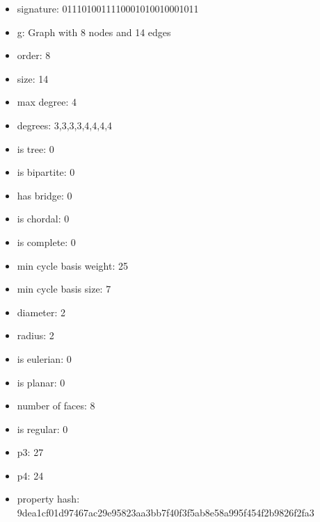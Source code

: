 \begin{itemize}
\item signature: 0111010011110001010010001011
\item g: Graph with 8 nodes and 14 edges
\item order: 8
\item size: 14
\item max degree: 4
\item degrees: 3,3,3,3,4,4,4,4
\item is tree: 0
\item is bipartite: 0
\item has bridge: 0
\item is chordal: 0
\item is complete: 0
\item min cycle basis weight: 25
\item min cycle basis size: 7
\item diameter: 2
\item radius: 2
\item is eulerian: 0
\item is planar: 0
\item number of faces: 8
\item is regular: 0
\item p3: 27
\item p4: 24
\item property hash: 9dea1cf01d97467ac29e95823aa3bb7f40f3f5ab8e58a995f454f2b9826f2fa3
\end{itemize}
\newpage
\begin{figure}
\end{figure}
